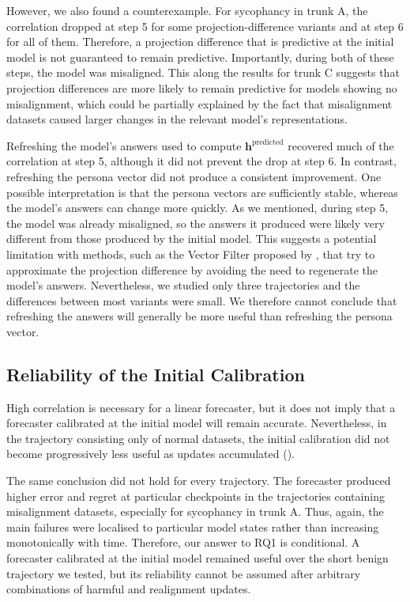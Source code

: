 However, we also found a counterexample. For sycophancy in trunk A, the correlation dropped at step 5 for some projection-difference variants and at step 6 for all of them. Therefore, a projection difference that is predictive at the initial model is not guaranteed to remain predictive. Importantly, during both of these steps, the model was misaligned. This along the results for trunk C suggests that projection differences are more likely to remain predictive for models showing no misalignment, which could be partially explained by the fact that misalignment datasets caused larger changes in the relevant model's representations.

Refreshing the model's answers used to compute $\mathbf{h}^{\text{predicted}}$ recovered much of the correlation at step 5, although it did not prevent the drop at step 6. In contrast, refreshing the persona vector did not produce a consistent improvement. One possible interpretation is that the persona vectors are sufficiently stable, whereas the model's answers can change more quickly. As we mentioned, during step 5, the model was already misaligned, so the answers it produced were likely very different from those produced by the initial model. This suggests a potential limitation with methods, such as the Vector Filter proposed by \citet{kowal2026conceptinfluenceleveraginginterpretability}, that try to approximate the projection difference by avoiding the need to regenerate the model's answers. Nevertheless, we studied only three trajectories and the differences between most variants were small. We therefore cannot conclude that refreshing the answers will generally be more useful than refreshing the persona vector.

\subsection{Reliability of the Initial Calibration}
High correlation is necessary for a linear forecaster, but it does not imply that a forecaster calibrated at the initial model will remain accurate. Nevertheless, in the trajectory consisting only of normal datasets, the initial calibration did not become progressively less useful as updates accumulated ().

The same conclusion did not hold for every trajectory. The forecaster produced higher error and regret at particular checkpoints in the trajectories containing misalignment datasets, especially for sycophancy in trunk A. Thus, again, the main failures were localised to particular model states rather than increasing monotonically with time. Therefore, our answer to RQ1 is conditional. A forecaster calibrated at the initial model remained useful over the short benign trajectory we tested, but its reliability cannot be assumed after arbitrary combinations of harmful and realignment updates.

